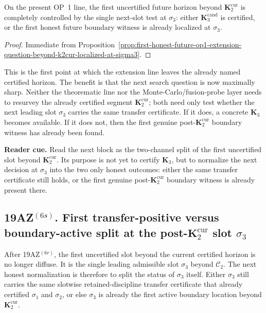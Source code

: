 \begin{corollary}
\label{cor:post-k2-horizon-controlled-by-single-next-slot-test}
On the present OP~1 line, the first uncertified future horizon beyond $\mathbf K_2^{\mathrm{cur}}$ is completely controlled by the single next-slot test at $\sigma_3$: either $\mathbf K_3^{\mathrm{cand}}$ is certified, or the first honest future boundary witness is already localized at $\sigma_3$.
\end{corollary}

\begin{proof}
Immediate from Proposition~\ref{prop:first-honest-future-op1-extension-question-beyond-k2cur-localized-at-sigma3}.
\end{proof}

\begin{remark}
\label{rem:what-first-post-k2-leading-slot-test-now-buys}
This is the first point at which the extension line leaves the already named certified horizon. The benefit is that the next search question is now maximally sharp. Neither the theorematic line nor the Monte-Carlo/fusion-probe layer needs to resurvey the already certified segment $\mathbf K_2^{\mathrm{cur}}$; both need only test whether the next leading slot $\sigma_3$ carries the same transfer certificate. If it does, a concrete $\mathbf K_3$ becomes available. If it does not, then the first genuine post-$\mathbf K_2^{\mathrm{cur}}$ boundary witness has already been found.
\end{remark}

\noindent\textbf{Reader cue.} Read the next block as the two-channel split of the first uncertified slot beyond $\mathbf K_2^{\mathrm{cur}}$. Its purpose is not yet to certify $\mathbf K_3$, but to normalize the next decision at $\sigma_3$ into the two only honest outcomes: either the same transfer certificate still holds, or the first genuine post-$\mathbf K_2^{\mathrm{cur}}$ boundary witness is already present there.

\subsection*{19AZ$^{(6s)}$. First transfer-positive versus boundary-active split at the post-$\mathbf K_2^{\mathrm{cur}}$ slot $\sigma_3$}
\label{sec:first-transfer-positive-versus-boundary-active-split-at-post-k2-slot-sigma3}
After 19AZ$^{(6r)}$, the first uncertified slot beyond the current certified horizon is no longer diffuse. It is the single leading admissible slot $\sigma_3$ beyond $\mathcal C_2$. The next honest normalization is therefore to split the status of $\sigma_3$ itself. Either $\sigma_3$ still carries the same slotwise retained-discipline transfer certificate that already certified $\sigma_1$ and $\sigma_2$, or else $\sigma_3$ is already the first active boundary location beyond $\mathbf K_2^{\mathrm{cur}}$.

